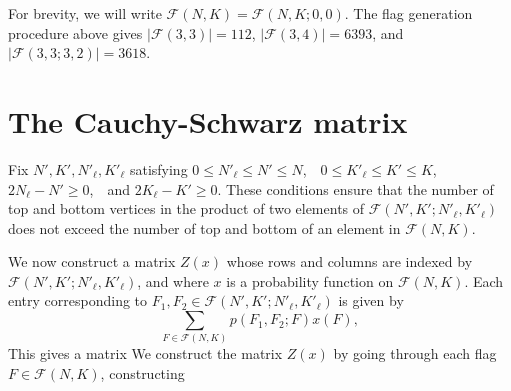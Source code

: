 \documentclass{article}
\def\cF{\mathcal{F}}
\begin{document}
For brevity, we will write $\cF(N,K) = \cF(N, K; 0, 0)$.
The flag generation procedure above gives $|\cF(3,3)|=112$, $|\cF(3,4)| = 6393$,
and $|\cF(3,3;3,2)| = 3618$.


\section{The Cauchy-Schwarz matrix}
Fix $N',K',N'_\ell, K'_\ell$ satisfying $0\leq N'_\ell \leq N'\leq N$,\ \  $0\leq K'_\ell \leq K'\leq K$,\ \ $2N_\ell - N' \geq 0$,\ \  and $2K_\ell - K'\geq 0$. These conditions ensure that the number of top and bottom vertices in the product of two elements of $\cF(N',K'; N'_\ell, K'_\ell)$  does not exceed the number of top and bottom of an element in $\cF(N, K)$.

We now construct a matrix $Z(x)$ whose rows and columns are indexed by 
$\cF(N',K'; N'_\ell, K'_\ell)$, and where $x$ is a probability function on $\cF(N, K)$. Each entry corresponding to $F_1, F_2 \in \cF(N',K'; N'_\ell, K'_\ell)$ is given by
\[
\sum_{F\in \cF(N,K)} p(F_1, F_2; F) x(F),
\]
This gives a matrix
We construct the matrix $Z(x)$ by going through each flag $F\in \cF(N,K)$, 
constructing 
\end{document}
